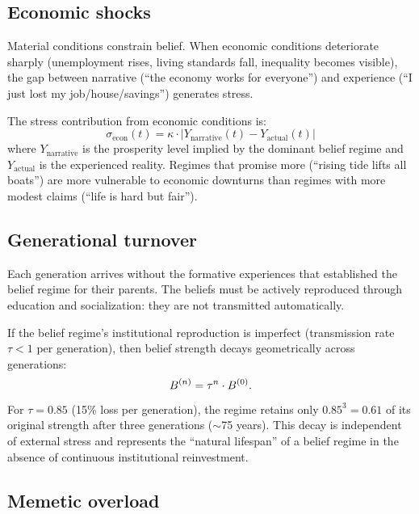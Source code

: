 \subsection{Economic shocks}

Material conditions constrain belief.
When economic conditions deteriorate sharply (unemployment rises, living standards fall, inequality becomes visible), the gap between narrative (``the economy works for everyone'') and experience (``I just lost my job/house/savings'') generates stress.

\begin{proposition}
\label{prop:material-narrative-gap}
The stress contribution from economic conditions is:
\[
  \sigma_{\text{econ}}(t) = \kappa \cdot |Y_{\text{narrative}}(t) - Y_{\text{actual}}(t)|
\]
where $Y_{\text{narrative}}$ is the prosperity level implied by the dominant belief regime and $Y_{\text{actual}}$ is the experienced reality.
Regimes that promise more (``rising tide lifts all boats'') are more vulnerable to economic downturns than regimes with more modest claims (``life is hard but fair'').
\end{proposition}

\subsection{Generational turnover}

Each generation arrives without the formative experiences that established the belief regime for their parents.
The beliefs must be actively reproduced through education and socialization: they are not transmitted automatically.

\begin{proposition}
\label{prop:generational-decay}
If the belief regime's institutional reproduction is imperfect (transmission rate $\tau < 1$ per generation), then belief strength decays geometrically across generations:
\[
  B_{}^{(n)} = \tau^n \cdot B_{}^{(0)}.
\]
For $\tau = 0.85$ (15\% loss per generation), the regime retains only $0.85^3 = 0.61$ of its original strength after three generations ($\sim$75 years).
This decay is independent of external stress and represents the ``natural lifespan'' of a belief regime in the absence of continuous institutional reinvestment.
\end{proposition}

\subsection{Memetic overload}

